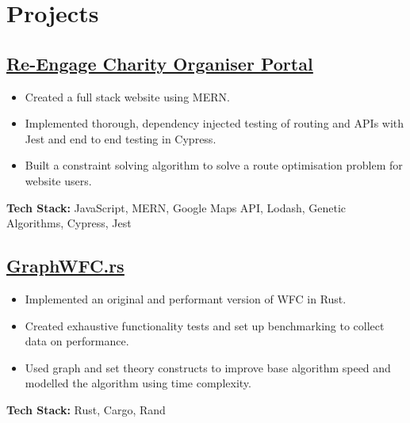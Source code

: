 \documentclass[12pt]{IEEEtran}
\begin{document}

\section*{\textbf{Projects}}
{
\color{blue}
\subsection*{\href{https://github.com/dpwdec/re-engage-charity-organiser-portal}{\underline{Re-Engage Charity Organiser Portal}}}
}
\begin{itemize}[topsep=\parskip]
\item Created a full stack website using MERN.
\item Implemented thorough, dependency injected testing of routing and APIs with Jest and end to end testing in Cypress.
\item Built a constraint solving algorithm to solve a route optimisation problem for website users.
\end{itemize}
\textbf{Tech Stack:} JavaScript, MERN, Google Maps API, Lodash, Genetic Algorithms, Cypress, Jest

{
\color{blue}
\subsection*{\href{https://github.com/SaiskiFunctions/GraphWFC.rs}{\underline{GraphWFC.rs}}}
}
\begin{itemize}[topsep=\parskip]
\item Implemented an original and performant version of WFC in Rust.
\item Created exhaustive functionality tests and set up benchmarking to collect data on performance.
\item Used graph and set theory constructs to improve base algorithm speed and modelled the algorithm using time complexity.
\end{itemize}
\textbf{Tech Stack:} Rust, Cargo, Rand

\iffalse
\subsection*{\href{https://github.com/dpwdec/Makersbnb}{Maker's B'n'B}}
\noindent{A full stack clone of Air B'n'B using entirely Ruby-based frameworks and libraries.} \\[5pt]
\textbf{Tech Stack:} Ruby, Sinatra, Sinatra-Flash, Bcrypt, Pony, RSpec, Capybara, PostgreSQL
\fi
\end{document}
